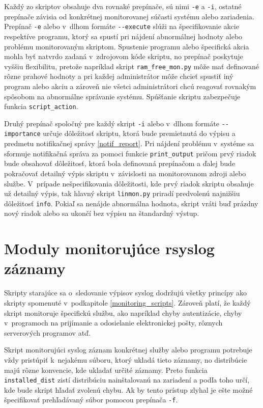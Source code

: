 Každý zo skriptov obsahuje dva rovnaké prepínače, sú nimi \texttt{-e} a \texttt{-i}, ostatné prepínače závisia od konkrétnej monitorovanej súčasti systému alebo zariadenia. 
Prepínač \texttt{-e} alebo v~dlhom formáte \texttt{{-}{-}execute} slúži na špecifikovanie akcie respektíve programu, ktorý sa spustí pri nájdení abnormálnej hodnoty alebo problému monitorovaným skriptom. Spustenie programu alebo špecifická akcia mohla byť natvrdo zadaná v~zdrojovom kóde skriptu, no prepínač poskytuje vyššiu flexibilitu, pretože napríklad skript \texttt{ram\_free\_mon.py} môže mať definované rôzne prahové hodnoty a pri každej administrátor môže chcieť spustiť iný program alebo akciu a zároveň nie všetci administrátori chcú reagovať rovnakým spôsobom na abnormálne správanie systému. Spúšťanie skriptu zabezpečuje funkcia \texttt{script\_action}. 

Druhý prepínač spoločný pre každý skript \texttt{-i} alebo v~dlhom formáte \texttt{{-}{-}importance} určuje dôležitosť skriptu, ktorá bude premietnutá do výpisu a predmetu notifikačnej správy \ref{notif_report}.  Pri nájdení problému v~systéme sa sformuje notifikačná správa za pomoci funkcie \texttt{print\_output} pričom prvý riadok bude obsahovať dôležitosť, ktorá bola definovaná prepínačom a ďalej bude pokračovať detailný výpis skriptu v~závislosti na monitorovanom zdroji alebo službe. V~prípade nešpecifikovania dôležitosti, kde prvý riadok skriptu obsahuje už detailný výpis, tak hlavný skript \texttt{linmon.py} priradí predvolenú najnižšiu dôležitosť \texttt{info}. Pokiaľ sa nenájde abnormálna hodnota, skript vráti buď prázdny nový riadok alebo sa ukončí bez výpisu na štandardný výstup. 

\section{Moduly monitorujúce rsyslog záznamy}
Skripty starajúce sa o~sledovanie výpisov syslog dodržujú všetky princípy ako skripty spomenuté v~podkapitole \ref{monitoring_scripts}. Zároveň platí, že každý skript monitoruje špecifickú službu, ako napríklad chyby autentizácie, chyby v~programoch na prijímanie a odosielanie elektronickej pošty, rôznych serverových programov atď. 

Skript monitorujúci syslog záznam konkrétnej služby alebo programu potrebuje vždy pristúpiť k~nejakému súboru, ktorý ukladá tieto záznamy, no distribúcie majú rôzne konvencie, kde ukladať určité záznamy. Preto funkcia \texttt{installed\_dist} zistí distribúciu nainštalovanú na zariadení a podľa toho určí, kde bude skript hľadať zvolenú chybu. Ak by tento prístup zlyhal je  ešte možné špecifikovať prehľadávaný súbor pomocou prepínača \texttt{-f}.

